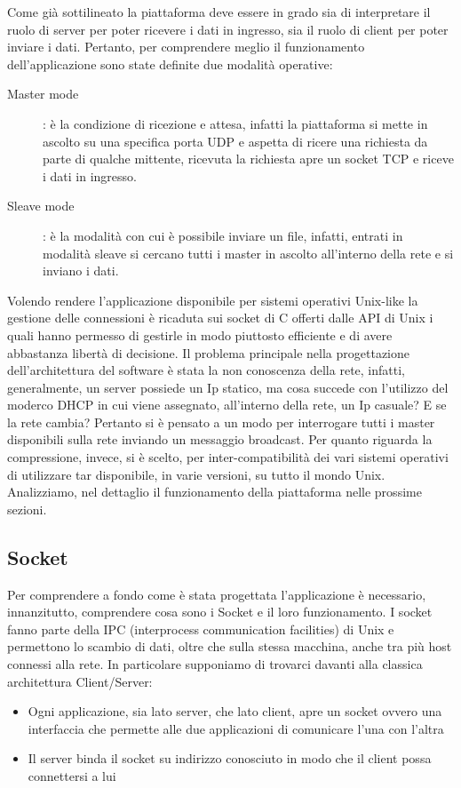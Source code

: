 \documentclass[11pt,fleqn]{book} %
\begin{document}
Come già sottilineato la piattaforma deve essere in grado sia di interpretare il ruolo di server per poter ricevere i dati in ingresso, sia il ruolo di client per poter inviare i dati. Pertanto, per comprendere meglio il funzionamento dell'applicazione sono state definite due modalità operative:
\begin{description}
\item[Master mode] : è la condizione di ricezione e attesa, infatti la piattaforma si mette in ascolto su una specifica porta UDP e aspetta di ricere una richiesta da parte di qualche mittente, ricevuta la richiesta apre un socket TCP e riceve i dati in ingresso.
\item [Sleave mode]: è la modalità con cui è possibile inviare un file, infatti, entrati in modalità sleave si cercano tutti i master in ascolto all'interno della rete e si inviano i dati.
\end{description}
Volendo rendere l'applicazione disponibile per sistemi operativi Unix-like la gestione delle connessioni è ricaduta sui socket di C offerti dalle API di Unix i quali hanno permesso di gestirle in modo piuttosto efficiente e di avere abbastanza libertà di decisione.
Il problema principale nella progettazione dell'architettura del software è stata la non conoscenza della rete, infatti, generalmente, un server possiede un Ip statico, ma cosa succede con l'utilizzo del moderco DHCP in cui viene assegnato, all'interno della rete, un Ip casuale? E se la rete cambia?
Pertanto si è pensato a un modo per interrogare tutti i master disponibili sulla rete inviando un messaggio broadcast.
Per quanto riguarda la compressione, invece, si è scelto, per inter-compatibilità dei vari sistemi operativi di utilizzare tar disponibile, in varie versioni, su tutto il mondo Unix.
Analizziamo, nel dettaglio il funzionamento della piattaforma nelle prossime sezioni.

\subsection{Socket}
Per comprendere a fondo come è stata progettata l'applicazione è necessario, innanzitutto, comprendere cosa sono i Socket e il loro funzionamento.
I socket fanno parte della IPC (interprocess communication facilities) di Unix e permettono lo scambio di dati, oltre che sulla stessa macchina, anche tra più host connessi alla rete. In particolare supponiamo di trovarci davanti alla classica architettura Client/Server:

\begin{itemize}
	\item Ogni applicazione, sia lato server, che lato client, apre un socket ovvero una interfaccia che permette alle due applicazioni di comunicare l'una con l'altra
	\item Il server binda il socket su indirizzo conosciuto in modo che il client possa connettersi a lui
\end{itemize}
\end{document}
